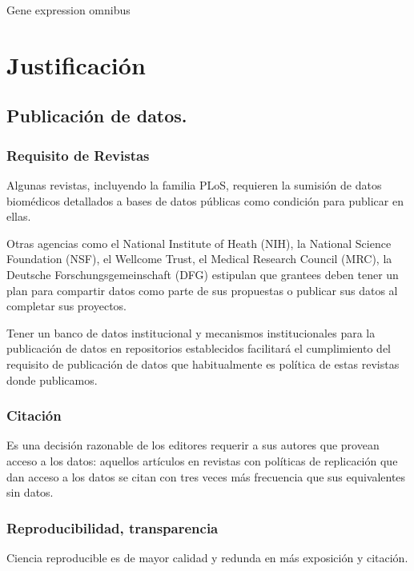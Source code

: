 \documentclass[
10pt, %
letterpaper, %
oneside, %
headinclude,footinclude, %
BCOR5mm, %
]{scrartcl}
\begin{document}
Gene expression omnibus

\section{Justificación}

\subsection{Publicación de datos.}


\subsubsection{Requisito de Revistas}

Algunas revistas, incluyendo la familia PLoS, requieren la sumisión de
datos biomédicos detallados a bases de datos públicas como condición
para publicar en ellas.\cite{piwowar_sharing_2007, hrynaszkiewicz}

Otras agencias como el National Institute of Heath (NIH), la National
Science Foundation (NSF), el Wellcome Trust, el Medical Research
Council (MRC), la Deutsche Forschungsgemeinschaft (DFG) estipulan que
grantees deben tener un plan para compartir datos como parte de sus
propuestas o publicar sus datos al completar sus
proyectos.\cite{wicherts_publish_2012}

Tener un banco de datos institucional y mecanismos institucionales
para la publicación de datos en repositorios establecidos facilitará
el cumplimiento del requisito de publicación de datos que
habitualmente es política de estas revistas donde publicamos.


\subsubsection{Citación}
Es una decisión razonable de los editores requerir a sus autores
que provean acceso a los datos: aquellos artículos en revistas con
políticas de replicación que dan acceso a los datos se citan con tres
veces más frecuencia que sus equivalentes sin datos.\cite{walport_sharing_2011}


\subsubsection{Reproducibilidad, transparencia}
Ciencia reproducible es de mayor calidad y redunda en más exposición y
citación. \cite{piwowar_sharing_2007} \cite{ioannidis}
\end{document}
